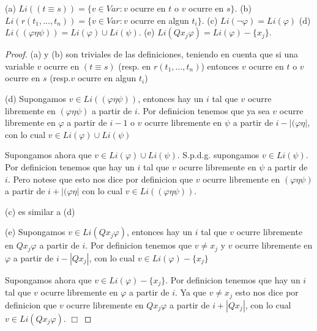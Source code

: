   \begin{lemma}
    (a) \(Li((t\equiv s))=\{v\in Var:v\) ocurre en \(t\) o \(v\) ocurre en \( s\}. \)
    (b) \(Li(r(t_{1},...,t_{n}))=\{v\in Var:v\) ocurre en algun \(t_{i}\}.\)
    (c) \(Li(\lnot \varphi )=Li(\varphi )\)
    (d) \(Li((\varphi \eta \psi ))=Li(\varphi )\cup Li(\psi ).\)
    (e) \(Li(Qx_{j}\varphi )=Li(\varphi )-\{x_{j}\}.\)
  \end{lemma}
  \begin{proof}
    (a) y (b) son triviales de las definiciones, teniendo en cuenta que si una variable \(v\) ocurre en \((t\equiv s)\) (resp. en \(r(t_{1},...,t_{n})\)) entonces \(v\) ocurre en \(t\) o \(v\) ocurre en \(s\) (resp.\(v\) ocurre en algun \( t_{i}\))

    (d) Supongamos \(v\in Li((\varphi \eta \psi ))\), entonces hay un \(i\) tal que \( v\) ocurre libremente en \((\varphi \eta \psi )\) a partir de \(i\). Por definicion tenemos que ya sea \(v\) ocurre libremente en \(\varphi \) a partir de \(i-1\) o \(v\) ocurre libremente en \(\psi \) a partir de \(i-\left\vert (\varphi \eta \right\vert \), con lo cual \(v\in Li(\varphi )\cup Li(\psi )\)

    Supongamos ahora que \(v\in Li(\varphi )\cup Li(\psi )\). S.p.d.g. supongamos \( v\in Li(\psi )\). Por definicion tenemos que hay un \(i\) tal que \(v\) ocurre libremente en \(\psi \) a partir de \(i\). Pero notese que esto nos dice por definicion que \(v\) ocurre libremente en \((\varphi \eta \psi )\) a partir de \( i+\left\vert (\varphi \eta \right\vert \) con lo cual \(v\in Li((\varphi \eta \psi ))\).

    (c) es similar a (d)

    (e) Supongamos \(v\in Li(Qx_{j}\varphi )\), entonces hay un \(i\) tal que \(v\) ocurre libremente en \(Qx_{j}\varphi \) a partir de \(i\). Por definicion tenemos que \(v\neq x_{j}\) y \(v\) ocurre libremente en \(\varphi \) a partir de \( i-\left\vert Qx_{j}\right\vert \), con lo cual \(v\in Li(\varphi )-\{x_{j}\}\)

    Supongamos ahora que \(v\in Li(\varphi )-\{x_{j}\}\). Por definicion tenemos que hay un \(i\) tal que \(v\) ocurre libremente en \(\varphi \) a partir de \(i\). Ya que \(v\neq x_{j}\) esto nos dice por definicion que \(v\) ocurre libremente en \(Qx_{j}\varphi \) a partir de \(i+\left\vert Qx_{j}\right\vert \), con lo cual \(v\in Li(Qx_{j}\varphi )\). \(\Box\)
  \end{proof}

